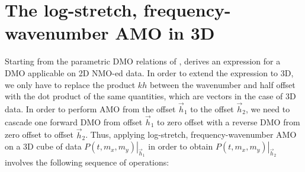 \section{The log-stretch, frequency-wavenumber AMO in 3D}
Starting from the parametric DMO relations of \cite{GEO58-01-00470066},
\cite{GEO61-03-08150820} derives an expression for a DMO applicable on
2D NMO-ed data. In order to extend the expression to 3D, we only have
to replace the product $kh$ between the wavenumber and half offset
with the dot product of the same quantities, which are vectors in the
case of 3D data. In order to perform AMO from the offset $\vec h_1$ to
the offset $\vec h_2$, we need to cascade one forward DMO from offset
$\vec h_1$ to zero offset with a reverse DMO from zero offset to
offset $\vec h_2$. Thus, applying log-stretch, frequency-wavenumber
AMO on a 3D cube of data $\left. {P\left( {t,m_x ,m_y } \right)}
\right|_{\vec h_1 }$ in order to obtain $\left. {P\left( {t,m_x ,m_y }
    \right)} \right|_{\vec h_2 }$ involves the following sequence of
operations:
